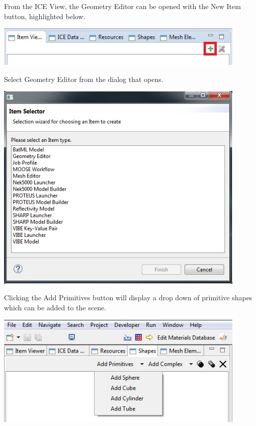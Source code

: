 \documentclass{article}
\begin{document}
From the ICE View, the Geometry Editor can be opened with the New Item button,
highlighted below. 

\begin{center}
\includegraphics[width=12cm]{images/NewItem}
\end{center}

Select Geometry Editor from the dialog that opens.

\begin{center}
\includegraphics[width=12cm]{images/NewItemDialog}
\end{center}

Clicking the Add Primitives button will display a drop down of primitive shapes
which can be added to the scene.

\begin{center}
\includegraphics[width=12cm]{images/AddPrimitiveShape}
\end{center}
\end{document}
